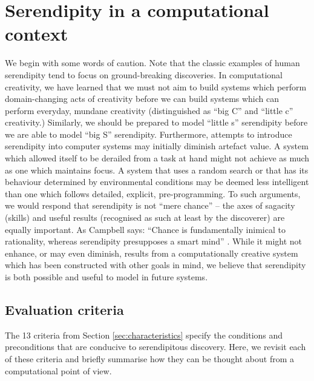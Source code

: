 \documentclass{llncs}
\begin{document}
\section{Serendipity in a computational context} \label{sec:computational-serendipity}

We begin with some words of caution.
%
Note that the classic examples of human serendipity tend to focus on
ground-breaking discoveries.  In computational creativity, we have
learned that we must not aim to build systems which perform
domain-changing acts of creativity before we can build systems which
can perform everyday, mundane creativity (distinguished as ``big C''
and ``little c'' creativity.)  Similarly, we should be prepared to
model ``little s'' serendipity before we are able to model ``big S''
serendipity.  Furthermore, attempts to introduce serendipity into
computer systems may initially diminish artefact value.
%
A system which allowed itself to be derailed from a task at hand might
not achieve as much as one which maintains focus.  A system that uses
a random search or that has its behaviour determined by environmental
conditions may be deemed less intelligent than one which follows
detailed, explicit, pre-programming.
%
To such arguments, we would respond that serendipity is not ``mere
chance'' -- the axes of sagacity (skills) and useful results
(recognised as such at least by the discoverer) are equally important.
As Campbell says: ``Chance is fundamentally inimical to rationality,
whereas serendipity presupposes a smart mind'' \cite{campbell}. While
it might not enhance, or may even diminish, results from a
computationally creative system which has been constructed with other
goals in mind, we believe that serendipity is both possible and useful
to model in future systems.

\subsection{Evaluation criteria} \label{sec:evaluation-criteria}

The 13 criteria from Section \ref{sec:characteristics}
specify the conditions and preconditions that are conducive to
serendipitous discovery.  Here, we revisit each of these criteria and
briefly summarise how they can be thought about from a computational
point of view.
\end{document}

